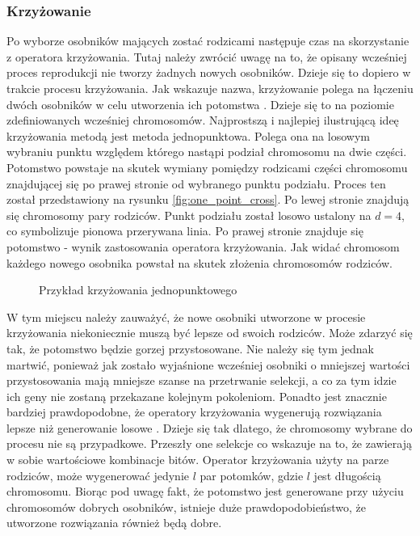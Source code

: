 \documentclass[twoside]{iisthesis}
\begin{document}
\subsubsection{Krzyżowanie}
Po wyborze osobników mających zostać rodzicami następuje czas na skorzystanie z operatora krzyżowania. Tutaj należy zwrócić uwagę na to, że opisany wcześniej proces reprodukcji nie tworzy żadnych nowych osobników. Dzieje się to dopiero w trakcie procesu krzyżowania. Jak wskazuje nazwa, krzyżowanie polega na łączeniu dwóch osobników w celu utworzenia ich potomstwa \cite{ga_book}. Dzieje się to na poziomie zdefiniowanych wcześniej chromosomów. Najprostszą i najlepiej ilustrującą ideę krzyżowania metodą jest metoda jednopunktowa. Polega ona na losowym wybraniu punktu względem którego nastąpi podział chromosomu na dwie części. Potomstwo powstaje na skutek wymiany pomiędzy rodzicami części chromosomu znajdującej się po prawej stronie od wybranego punktu podziału. Proces ten został przedstawiony na rysunku \eqref{fig:one_point_cross}. Po lewej stronie znajdują się chromosomy pary rodziców. Punkt podziału został losowo ustalony na $d=4$, co symbolizuje pionowa przerywana linia. Po prawej stronie znajduje się potomstwo - wynik zastosowania operatora krzyżowania. Jak widać chromosom każdego nowego osobnika powstał na skutek złożenia chromosomów rodziców.
\begin{figure}[!htb]
	\centering
	\caption{Przykład krzyżowania jednopunktowego}
	\label{fig:one_point_cross}
\end{figure}

W tym miejscu należy zauważyć, że nowe osobniki utworzone w procesie krzyżowania niekoniecznie muszą być lepsze od swoich rodziców. Może zdarzyć się tak, że potomstwo będzie gorzej przystosowane. Nie należy się tym jednak martwić, ponieważ jak zostało wyjaśnione wcześniej osobniki o mniejszej wartości przystosowania mają mniejsze szanse na przetrwanie selekcji, a co za tym idzie ich geny nie zostaną przekazane kolejnym pokoleniom. Ponadto jest znacznie bardziej prawdopodobne, że operatory krzyżowania wygenerują rozwiązania lepsze niż generowanie losowe \cite{book}. Dzieje się tak dlatego, że chromosomy wybrane do procesu nie są przypadkowe. Przeszły one selekcje co wskazuje na to, że zawierają w sobie wartościowe kombinacje bitów. Operator krzyżowania użyty na parze rodziców, może wygenerować jedynie $l$ par potomków, gdzie $l$ jest długością chromosomu. Biorąc pod uwagę fakt, że potomstwo jest generowane przy użyciu chromosomów dobrych osobników, istnieje duże prawdopodobieństwo, że utworzone rozwiązania również będą dobre.
\end{document}
